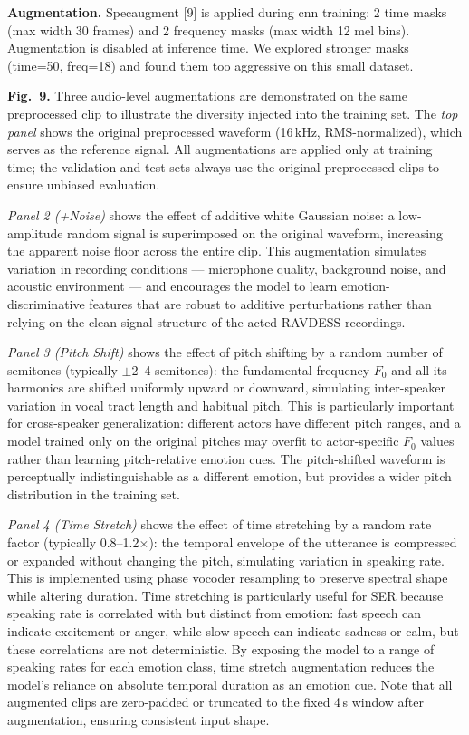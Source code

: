 \documentclass[conference]{IEEEtran}
\begin{document}
\textbf{Augmentation.} Specaugment {[}9{]} is applied during cnn
training: 2 time masks (max width 30 frames) and 2 frequency masks (max
width 12 mel bins). Augmentation is disabled at inference time. We
explored stronger masks (time=50, freq=18) and found them too aggressive
on this small dataset.

\textbf{Fig.~9.} Three audio-level augmentations are 
demonstrated on the same preprocessed clip to illustrate 
the diversity injected into the training set. The 
\textit{top panel} shows the original preprocessed 
waveform (16\,kHz, RMS-normalized), which serves as the 
reference signal. All augmentations are applied only 
at training time; the validation and test sets always 
use the original preprocessed clips to ensure unbiased 
evaluation.

\textit{Panel 2 (+Noise)} shows the effect of additive 
white Gaussian noise: a low-amplitude random signal is 
superimposed on the original waveform, increasing the 
apparent noise floor across the entire clip. This 
augmentation simulates variation in recording conditions 
--- microphone quality, background noise, and acoustic 
environment --- and encourages the model to learn 
emotion-discriminative features that are robust to 
additive perturbations rather than relying on the 
clean signal structure of the acted RAVDESS recordings.

\textit{Panel 3 (Pitch Shift)} shows the effect of 
pitch shifting by a random number of semitones (typically 
$\pm$2--4 semitones): the fundamental frequency $F_0$ 
and all its harmonics are shifted uniformly upward or 
downward, simulating inter-speaker variation in vocal 
tract length and habitual pitch. This is particularly 
important for cross-speaker generalization: different 
actors have different pitch ranges, and a model trained 
only on the original pitches may overfit to 
actor-specific $F_0$ values rather than learning 
pitch-relative emotion cues. The pitch-shifted waveform 
is perceptually indistinguishable as a different emotion, 
but provides a wider pitch distribution in the training 
set.

\textit{Panel 4 (Time Stretch)} shows the effect of 
time stretching by a random rate factor (typically 
0.8--1.2$\times$): the temporal envelope of the 
utterance is compressed or expanded without changing 
the pitch, simulating variation in speaking rate. 
This is implemented using phase vocoder resampling 
to preserve spectral shape while altering duration. 
Time stretching is particularly useful for SER because 
speaking rate is correlated with but distinct from 
emotion: fast speech can indicate excitement or anger, 
while slow speech can indicate sadness or calm, but 
these correlations are not deterministic. By exposing 
the model to a range of speaking rates for each 
emotion class, time stretch augmentation reduces 
the model's reliance on absolute temporal duration 
as an emotion cue. Note that all augmented clips 
are zero-padded or truncated to the fixed 4\,s 
window after augmentation, ensuring consistent 
input shape.
\end{document}
